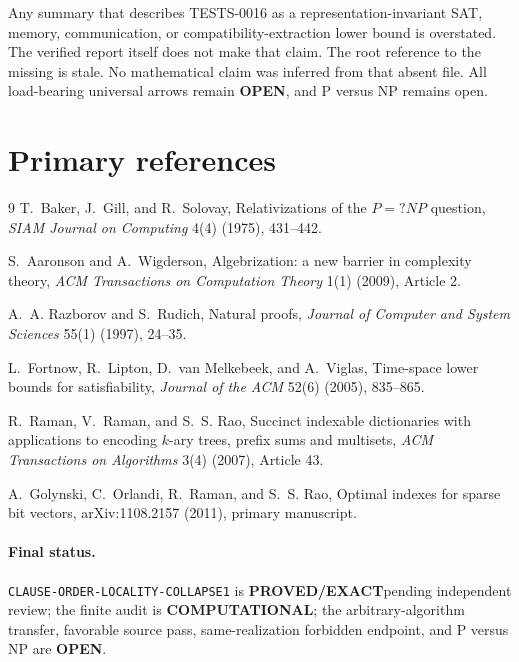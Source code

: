 \documentclass[11pt]{article}
\newcommand{\EXACT}{\textbf{PROVED/EXACT}}
\newcommand{\COMP}{\textbf{COMPUTATIONAL}}
\newcommand{\OPEN}{\textbf{OPEN}}
\begin{document}
Any summary that describes TESTS-0016 as a representation-invariant SAT,
memory, communication, or compatibility-extraction lower bound is overstated.
The verified report itself does not make that claim.  The root reference to
the missing  is stale.  No mathematical
claim was inferred from that absent file.  All load-bearing universal arrows
remain \OPEN, and P versus NP remains open.

\section{Primary references}
\begin{thebibliography}{9}
T.~Baker, J.~Gill, and R.~Solovay,
Relativizations of the $P=?NP$ question,
\emph{SIAM Journal on Computing} 4(4) (1975), 431--442.

S.~Aaronson and A.~Wigderson,
Algebrization: a new barrier in complexity theory,
\emph{ACM Transactions on Computation Theory} 1(1) (2009), Article 2.

A.~A. Razborov and S.~Rudich,
Natural proofs,
\emph{Journal of Computer and System Sciences} 55(1) (1997), 24--35.

L.~Fortnow, R.~Lipton, D.~van Melkebeek, and A.~Viglas,
Time-space lower bounds for satisfiability,
\emph{Journal of the ACM} 52(6) (2005), 835--865.

R.~Raman, V.~Raman, and S.~S. Rao,
Succinct indexable dictionaries with applications to encoding $k$-ary trees,
prefix sums and multisets,
\emph{ACM Transactions on Algorithms} 3(4) (2007), Article 43.

A.~Golynski, C.~Orlandi, R.~Raman, and S.~S. Rao,
Optimal indexes for sparse bit vectors,
arXiv:1108.2157 (2011), primary manuscript.
\end{thebibliography}

\paragraph{Final status.}
\texttt{CLAUSE-ORDER-LOCALITY-COLLAPSE1} is \EXACT pending independent
review; the finite audit is \COMP; the arbitrary-algorithm transfer,
favorable source pass, same-realization forbidden endpoint, and P versus NP
are \OPEN.

\end{document}
